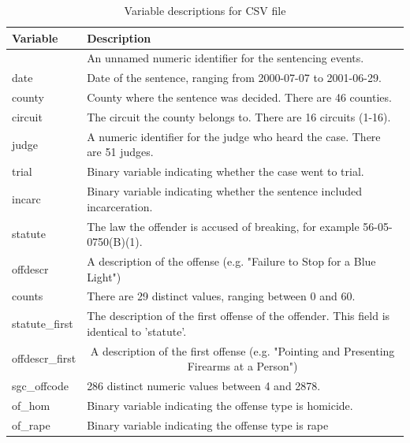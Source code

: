 \documentclass[11pt]{article}
\theoremstyle{ModifiedStyle}
\begin{document}
      \begin{table}[H]
        \centering
        \caption{Variable descriptions for CSV file}
        \label{tab:csv-vars}
        \begin{tabular}{|ll|}
        \hline
        \textbf{Variable} & \textbf{Description}                                                        \\ \hline
                          & An unnamed numeric identifier for the sentencing events.                    \\
        date              & Date of the sentence, ranging from 2000-07-07 to 2001-06-29.                \\
        county            & County where the sentence was decided. There are 46 counties.               \\
        circuit           & The circuit the county belongs to. There are 16 circuits (1-16).            \\
        judge             & A numeric identifier for the judge who heard the case. There are 51 judges. \\
        trial             & Binary variable indicating whether the case went to trial.                  \\
        incarc            & Binary variable indicating whether the sentence included incarceration.     \\
        statute           & The law the offender is accused of breaking, for example 56-05-0750(B)(1).  \\
        offdescr          & A description of the offense (e.g. "Failure to Stop for a Blue Light")      \\
        counts            & There are 29 distinct values, ranging between 0 and 60.                     \\
        statute\_first  & The description of the first offense of the offender. This field is identical to 'statute'.                   \\
        offdescr\_first & \multicolumn{1}{c|}{A description of the first offense (e.g. "Pointing and Presenting Firearms at a Person")} \\
        sgc\_offcode      & 286 distinct numeric values between 4 and 2878.                             \\
        of\_hom           & Binary variable indicating the offense type is homicide.                    \\
        of\_rape          & Binary variable indicating the offense type is rape                         \\

\end{tabular}
\end{table}
\end{document}
